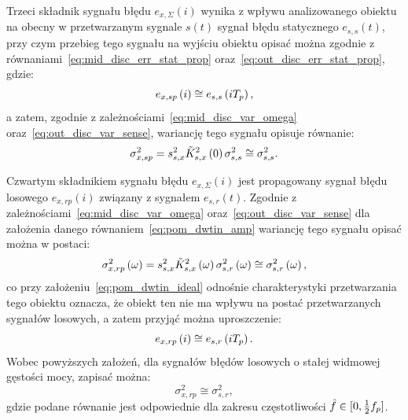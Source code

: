 Trzeci składnik sygnału błędu $e_{x,\Sigma}(i)$ wynika z wpływu analizowanego obiektu na obecny w przetwarzanym sygnale $s(t)$ sygnał błędu statycznego $e_{s,s}(t)$, przy czym przebieg tego sygnału na wyjściu obiektu opisać można zgodnie z równaniami~\eqref{eq:mid_disc_err_stat_prop} oraz~\eqref{eq:out_disc_err_stat_prop}, gdzie:
\begin{equation}
e_{x,sp} \left(i\right) \cong e_{s,s} \left(i T_{p}\right) \label{eq:pom_errx_stat_prop},
\end{equation}
a zatem, zgodnie z zależnościami~\eqref{eq:mid_disc_var_omega} oraz~\eqref{eq:out_disc_var_sense}, wariancję tego sygnału opisuje równanie:
\begin{equation}
\sigma_{x,sp}^{2} = s_{s,x}^{2} \tilde{K}_{s,x}^{2} \left(0\right) \sigma_{s,s}^{2} \cong \sigma_{s,s}^{2} \label{eq:pom_varx_stat_prop}.
\end{equation}

Czwartym składnikiem sygnału błędu $e_{x,\Sigma}(i)$ jest propagowany sygnał błędu losowego $e_{x,rp}(i)$ związany z sygnałem $e_{s,r}(t)$. Zgodnie z zależnościami~\eqref{eq:mid_disc_var_omega} oraz~\eqref{eq:out_disc_var_sense} dla założenia danego równaniem~\eqref{eq:pom_dwtin_amp} wariancję tego sygnału opisać można w postaci:
\begin{equation}
\sigma_{x,rp}^{2} \left(\omega\right) = s_{s,x}^{2} \tilde{K}_{s,x}^{2} \left(\omega\right) \sigma_{s,r}^{2} \left(\omega\right) \cong \sigma_{s,r}^{2} \left(\omega\right) \label{eq:pom_varx_rand_prop_omega},
\end{equation}
co przy założeniu~\eqref{eq:pom_dwtin_ideal} odnośnie charakterystyki przetwarzania tego obiektu oznacza, że obiekt ten nie ma wpływu na postać przetwarzanych sygnałów losowych, a zatem przyjąć można uproszczenie:
\begin{equation}
e_{x,rp} \left(i\right) \cong e_{s,r} \left(i T_{p}\right) \label{eq:pom_errx_rand_prop}.
\end{equation}
Wobec powyższych założeń, dla sygnałów błędów losowych o stałej widmowej gęstości mocy, zapisać można:
\begin{equation}
\sigma_{x,rp}^{2} \cong \sigma_{s,r}^{2} \label{eq:pom_varx_rand_prop},
\end{equation}
gdzie podane równanie jest odpowiednie dla zakresu częstotliwości $\hat{f} \in \interval{0}{\frac{1}{2} f_{p}}$.

